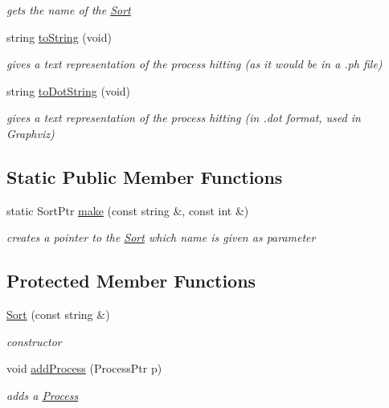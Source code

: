 \begin{DoxyCompactItemize}
\begin{DoxyCompactList}\small\item\em gets the name of the \hyperlink{class_sort}{\-Sort} \end{DoxyCompactList}\item 
string \hyperlink{class_sort_ae160613fb2d5c7fd9818a5c7d4be992a}{to\-String} (void)
\begin{DoxyCompactList}\small\item\em gives a text representation of the process hitting (as it would be in a .ph file) \end{DoxyCompactList}\item 
string \hyperlink{class_sort_a9bb67cd444d217dd477c896a31d869a0}{to\-Dot\-String} (void)
\begin{DoxyCompactList}\small\item\em gives a text representation of the process hitting (in .dot format, used in \-Graphviz) \end{DoxyCompactList}\end{DoxyCompactItemize}
\subsection*{\-Static \-Public \-Member \-Functions}
\begin{DoxyCompactItemize}
\item 
static \-Sort\-Ptr \hyperlink{class_sort_a9c3fa1c3b71839c425d99a7fa86a9cc2}{make} (const string \&, const int \&)
\begin{DoxyCompactList}\small\item\em creates a pointer to the \hyperlink{class_sort}{\-Sort} which name is given as parameter \end{DoxyCompactList}\end{DoxyCompactItemize}
\subsection*{\-Protected \-Member \-Functions}
\begin{DoxyCompactItemize}
\item 
\hypertarget{class_sort_ab9d3cb2bb873e058d0129e793c947d45}{\hyperlink{class_sort_ab9d3cb2bb873e058d0129e793c947d45}{\-Sort} (const string \&)}\label{class_sort_ab9d3cb2bb873e058d0129e793c947d45}

\begin{DoxyCompactList}\small\item\em constructor \end{DoxyCompactList}\item 
void \hyperlink{class_sort_a63bd04693623b2a269e76b9d5269e880}{add\-Process} (\-Process\-Ptr p)
\begin{DoxyCompactList}\small\item\em adds a \hyperlink{class_process}{\-Process} \end{DoxyCompactList}\end{DoxyCompactItemize}
